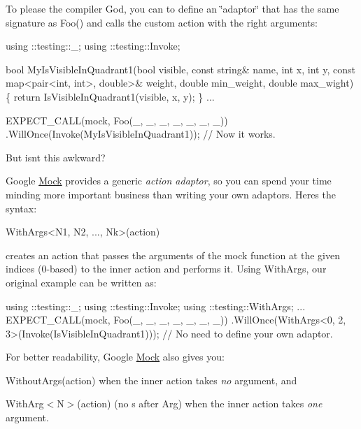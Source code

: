 To please the compiler God, you can to define an \char`\"{}adaptor\char`\"{} that has the same signature as {\ttfamily Foo()} and calls the custom action with the right arguments\+:


\begin{DoxyCode}
using ::testing::\_;
using ::testing::Invoke;

bool MyIsVisibleInQuadrant1(bool visible, const string& name, int x, int y,
                            const map<pair<int, int>, double>& weight,
                            double min\_weight, double max\_wight) \{
  return IsVisibleInQuadrant1(visible, x, y);
\}
...

  EXPECT\_CALL(mock, Foo(\_, \_, \_, \_, \_, \_, \_))
      .WillOnce(Invoke(MyIsVisibleInQuadrant1));  // Now it works.
\end{DoxyCode}


But isn\textquotesingle{}t this awkward?

Google \hyperlink{class_mock}{Mock} provides a generic {\itshape action adaptor}, so you can spend your time minding more important business than writing your own adaptors. Here\textquotesingle{}s the syntax\+:


\begin{DoxyCode}
WithArgs<N1, N2, ..., Nk>(action)
\end{DoxyCode}


creates an action that passes the arguments of the mock function at the given indices (0-\/based) to the inner {\ttfamily action} and performs it. Using {\ttfamily With\+Args}, our original example can be written as\+:


\begin{DoxyCode}
using ::testing::\_;
using ::testing::Invoke;
using ::testing::WithArgs;
...
  EXPECT\_CALL(mock, Foo(\_, \_, \_, \_, \_, \_, \_))
      .WillOnce(WithArgs<0, 2, 3>(Invoke(IsVisibleInQuadrant1)));
      // No need to define your own adaptor.
\end{DoxyCode}


For better readability, Google \hyperlink{class_mock}{Mock} also gives you\+:


\begin{DoxyItemize}
\item {\ttfamily Without\+Args(action)} when the inner {\ttfamily action} takes {\itshape no} argument, and
\item {\ttfamily With\+Arg$<$N$>$(action)} (no {\ttfamily s} after {\ttfamily Arg}) when the inner {\ttfamily action} takes {\itshape one} argument.
\end{DoxyItemize}

